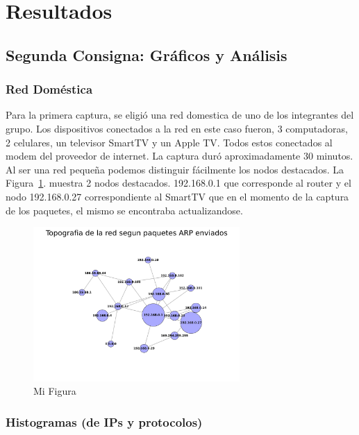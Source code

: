 \section{Resultados}

\subsection{Segunda Consigna: Gráficos y Análisis}

\subsubsection{Red Doméstica}

Para la primera captura, se eligió una red domestica de uno de los integrantes del grupo. Los dispositivos conectados a la red en este caso fueron, 3 computadoras, 2 celulares, un televisor SmartTV y un Apple TV. Todos estos conectados al modem del proveedor de internet.
La captura duró aproximadamente 30 minutos.
Al ser una red pequeña podemos distinguir fácilmente los nodos destacados.
La Figura~\ref{fig:red_domestica_network}. muestra 2 nodos destacados. 192.168.0.1 que corresponde al router  y el nodo 192.168.0.27 correspondiente al SmartTV que en el momento de la captura de los paquetes, el mismo se encontraba actualizandose.

\begin{figure}[h!]
  \centering
   \includegraphics[width=0.7\textwidth]{graficos/red_domestica_network.png}
  \caption{Mi Figura}
  \label{fig:red_domestica_network}
\end{figure}

\FloatBarrier

\subsubsection{Histogramas (de IPs y protocolos)}

